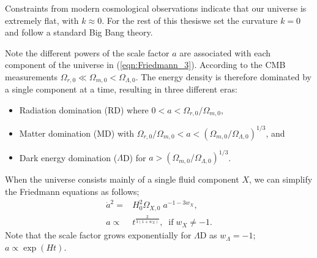 \documentclass[a4paper,12pt,times,custombib,print,index]{Classes/PhDThesisPSnPDF} %
\providecommand{\DIFadd}[1]{{\protect\color{blue}\uwave{#1}}} %
\providecommand{\DIFaddbegin}{} %
\providecommand{\DIFaddend}{} %
\newcommand{\DIFaddincludegraphics}[2][]{{\color{blue}\fbox{\DIFOincludegraphics[#1]{#2}}}} %
\DeclareRobustCommand{\DIFaddbegin}{\DIFOaddbegin \let\includegraphics\DIFaddincludegraphics} %
\DeclareRobustCommand{\DIFaddend}{\DIFOaddend \let\includegraphics\DIFOincludegraphics} %
\begin{document}
Constraints from modern cosmological observations indicate that our universe is extremely flat, with $k\approx 0$. For the rest of this thesis\DIFaddbegin \DIFadd{, }\DIFaddend we set the curvature $k=0$ and follow a standard Big Bang theory.

Note the different powers of the scale factor $a$ are associated with each component of the universe in (\ref{eqn:Friedmann_3}). According to the CMB measurements $\Omega_{r,0} \ll \Omega_{m,0} < \Omega_{\Lambda,0}$. The energy density is therefore dominated by a single component at a time, resulting in three different eras:
\begin{itemize}
	\item Radiation domination (RD) where $0 < a < \Omega_{r,0}/\Omega_{m,0}$,
	\item Matter domination (MD) with $\Omega_{r,0}/\Omega_{m,0} < a < (\Omega_{m,0}/\Omega_{\Lambda,0})^{1/3}$, and
	\item Dark energy domination ($\Lambda$D) for $a > (\Omega_{m,0}/\Omega_{\Lambda,0})^{1/3}$.
\end{itemize}
When the universe consists mainly of a single fluid component $X$, we can simplify the Friedmann equations as follows;
\begin{align}
	\dot{a}^2 =& H_0^2 \Omega_{X,0} \; a^{-1-3w_X}, \label{eqn:Friedmann_single_fluid}\\
	a \propto& t^\frac{2}{3(1+w_X)}, \;\; \text{if} \; w_X \neq -1.
\end{align}
Note that the scale factor grows exponentially for $\Lambda$D as $w_\Lambda=-1$; $a\propto \exp(Ht)$.
\end{document}
